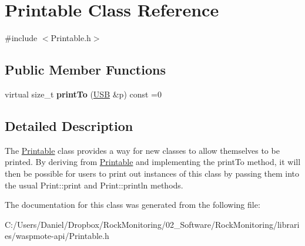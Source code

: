 \hypertarget{class_printable}{}\section{Printable Class Reference}
\label{class_printable}


{\ttfamily \#include $<$Printable.\+h$>$}

\subsection*{Public Member Functions}
\begin{DoxyCompactItemize}
\item 
virtual size\+\_\+t {\bfseries print\+To} (\hyperlink{_wasp_u_s_b_8h_a85a7e7fc2858e55107945fe67d2d3932}{U\+SB} \&p) const  =0\hypertarget{class_printable_a8876df4bfe5ec3a26d5957f949a79f4b}{}\label{class_printable_a8876df4bfe5ec3a26d5957f949a79f4b}

\end{DoxyCompactItemize}


\subsection{Detailed Description}
The \hyperlink{class_printable}{Printable} class provides a way for new classes to allow themselves to be printed. By deriving from \hyperlink{class_printable}{Printable} and implementing the print\+To method, it will then be possible for users to print out instances of this class by passing them into the usual Print\+::print and Print\+::println methods. 

The documentation for this class was generated from the following file\+:\begin{DoxyCompactItemize}
\item 
C\+:/\+Users/\+Daniel/\+Dropbox/\+Rock\+Monitoring/02\+\_\+\+Software/\+Rock\+Monitoring/libraries/waspmote-\/api/Printable.\+h\end{DoxyCompactItemize}
